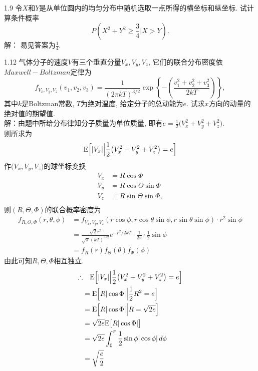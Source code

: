 1.9 令$X$和$Y$是从单位圆内的均匀分布中随机选取一点所得的横坐标和纵坐标. 试计算条件概率
	\[
	P\left(X^2+Y^2 \geqslant \frac{3}{4} \bigg| X > Y\right).
	\]
解：
易见答案为$\frac{1}{4}$.






1.12 气体分子的速度$V$有三个垂直分量$V_x, V_y, V_z$, 它们的联合分布密度依$Maxwell-Boltzman$定律为
	\[
	f_{V_x, V_y, V_z}(v_1, v_2, v_3) = \frac{1}{(2\pi kT)^{3/2}}\exp\left\{-\left(\frac{v^2_1+v^2_2+v^2_3}{2kT}\right)\right\},
	\]
	其中$k$是Boltzman常数, $T$为绝对温度, 给定分子的总动能为$e$. 试求$x$方向的动量的绝对值的期望值.\\ 
解：由题中所给分布律知分子质量为单位质量, 即有$e = \frac{1}{2}\big(V^2_x+V^2_y+V^2_z\big)$.\\
则所求为
\[
\mathrm{E} \Big[|V_x|\Big|\frac{1}{2}\big(V^2_x+V^2_y+V^2_z\big) = e\Big]
\]
作$\big(V_x, V_y, V_z\big)$的球坐标变换
\[
\begin{split}
V_x & = R\cos\Phi\\
V_y & = R\cos\Theta\sin\Phi\\
V_z & = R\sin\Theta\sin\Phi,\\
\end{split}
\]
则$(R,\Theta,\Phi)$的联合概率密度为
\[
\begin{split}
f_{R,\Theta,\Phi}(r,\theta,\phi) & = f_{V_x, V_y, V_z}(r\cos\phi,r\cos\theta\sin\phi,r\sin\theta\sin\phi)\cdot r^2\sin\phi\\
								& = \frac{\sqrt{2}r^2}{\sqrt{\pi}(kT)^{3/2}}e^{-r^2/2kT}\cdot \frac{1}{2\pi}\cdot \frac{1}{2}\sin\phi\\
								& = f_R(r)f_\Theta(\theta)f_\Phi(\phi)
\end{split}
\]
由此可知$R,\Theta,\Phi$相互独立.\\
\[
\begin{split}
\therefore & \quad \mathrm{E}\Big[|V_x|\Big|\frac{1}{2}\big(V^2_x+V^2_y+V^2_z\big) = e\Big]\\
		& = \mathrm{E}\Big[R|\cos\Phi|\Big|\frac{1}{2}R^2 = e\Big]\\
		& = \mathrm{E}\Big[R|\cos\Phi|\Big|R = \sqrt{2e}\Big]\\
		& = \sqrt{2e}\mathrm{E}\big[R|\cos\Phi|\big]\\
		& = \sqrt{2e}\int^\pi_0\frac{1}{2}\sin\phi|\cos\phi|\,d\phi\\
		& = \sqrt{\frac{e}{2}}
\end{split}
\]



